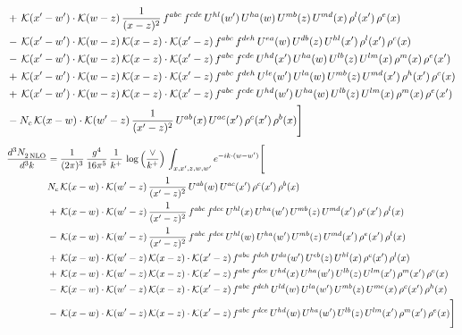 \documentclass[9pt]{article}
\numberwithin{equation}{section}
\begin{document}
\begin{align}
&+\,\mathcal{K}(x'-w')\cdot\mathcal{K}(w-z)\,\frac{1}{(x-z)^{2}}\,f^{abc}\,f^{cde}\,U^{hl}(w')\,U^{ha}(w)\,U^{mb}(z)\,U^{md}(x)\,\rho^{l}(x')\,\rho^{e}(x)\notag\\
&-\,\mathcal{K}(x'-w')\cdot\mathcal{K}(w-z)\,\mathcal{K}(x-z)\cdot\mathcal{K}(x'-z)\,f^{abc}\,f^{deh}\,U^{ea}(w)\,U^{db}(z)\,U^{hl}(x')\,\rho^{l}(x')\,\rho^{c}(x)\notag\\
&-\,\mathcal{K}(x'-w')\cdot\mathcal{K}(w-z)\,\mathcal{K}(x-z)\cdot\mathcal{K}(x'-z)\,f^{abc}\,f^{cde}\,U^{hd}(x')\,U^{ha}(w)\,U^{lb}(z)\,U^{lm}(x)\,\rho^{m}(x)\,\rho^{e}(x')\notag\\
&+\,\mathcal{K}(x'-w')\cdot\mathcal{K}(w-z)\,\mathcal{K}(x-z)\cdot\mathcal{K}(x'-z)\,f^{abc}\,f^{deh}\,U^{le}(w')\,U^{la}(w)\,U^{mb}(z)\,U^{md}(x')\,\rho^{h}(x')\,\rho^{c}(x)\notag\\
&+\,\mathcal{K}(x'-w')\cdot\mathcal{K}(w-z)\,\mathcal{K}(x-z)\cdot\mathcal{K}(x'-z)\,f^{abc}\,f^{cde}\,U^{hd}(w')\,U^{ha}(w)\,U^{lb}(z)\,U^{lm}(x)\,\rho^{m}(x)\,\rho^{e}(x')\notag\\
&-N_{c}\,\mathcal{K}(x-w)\cdot\mathcal{K}(w'-z)\,\frac{1}{(x'-z)^{2}}\,U^{ab}(x)\,U^{ac}(x')\,\rho^{c}(x')\,\rho^{b}(x)\Bigg]
\end{align}
\begin{align}
\frac{d^{3}N_{2\,\rm NLO}^{\rm}}{d^{3}k}  & = \frac{1}{(2\pi)^{3}}\,\frac{g^{4}}{16\pi^{5}}\,\frac{1}{k^{+}}\,\log{\left(\frac{\vee}{k^{+}}\right)}\, \int_{x,x',z,w,w'}e^{-ik\cdot (w-w')}\Bigg[\notag\\ &    N_{c}\,\mathcal{K}(x-w)\cdot\mathcal{K}(w'-z)\,\frac{1}{(x'-z)^{2}}\,U^{ab}(w)\,U^{ac}(x')\,\rho^{c}(x')\,\rho^{b}(x)\notag\\
&+\,\mathcal{K}(x-w)\cdot\mathcal{K}(w'-z)\,\frac{1}{(x'-z)^{2}}\,f^{abc}\,f^{dce}\,U^{hl}(x)\,U^{ha}(w')\,U^{mb}(z)\,U^{md}(x')\,\rho^{e}(x')\,\rho^{l}(x)\notag\\
&-\,\mathcal{K}(x-w)\cdot\mathcal{K}(w'-z)\,\frac{1}{(x'-z)^{2}}\,f^{abc}\,f^{dce}\,U^{hl}(w)\,U^{ha}(w')\,U^{mb}(z)\,U^{md}(x')\,\rho^{e}(x')\,\rho^{l}(x)\notag\\
&+\,\mathcal{K}(x-w)\cdot\mathcal{K}(w'-z)\,\mathcal{K}(x-z)\cdot\mathcal{K}(x'-z)\,f^{abc}\,f^{deh}\,U^{da}(w')\,U^{eb}(z)\,U^{hl}(x)\,\rho^{c}(x')\,\rho^{l}(x)\notag\\
&+\,\mathcal{K}(x-w)\cdot\mathcal{K}(w'-z)\,\mathcal{K}(x-z)\cdot\mathcal{K}(x'-z)\,f^{abc}\,f^{dce}\,U^{hd}(x)\,U^{ha}(w')\,U^{lb}(z)\,U^{lm}(x')\,\rho^{m}(x')\,\rho^{e}(x)\notag\\
&-\,\mathcal{K}(x-w)\cdot\mathcal{K}(w'-z)\,\mathcal{K}(x-z)\cdot\mathcal{K}(x'-z)\,f^{abc}\,f^{deh}\,U^{ld}(w)\,U^{la}(w')\,U^{mb}(z)\,U^{me}(x)\,\rho^{c}(x')\,\rho^{h}(x)\notag\\
&-\,\mathcal{K}(x-w)\cdot\mathcal{K}(w'-z)\,\mathcal{K}(x-z)\cdot\mathcal{K}(x'-z)\,f^{abc}\,f^{dce}\,U^{hd}(w)\,U^{ha}(w')\,U^{lb}(z)\,U^{lm}(x')\,\rho^{m}(x')\,\rho^{e}(x)\Bigg]
\end{align} 
\end{document}
